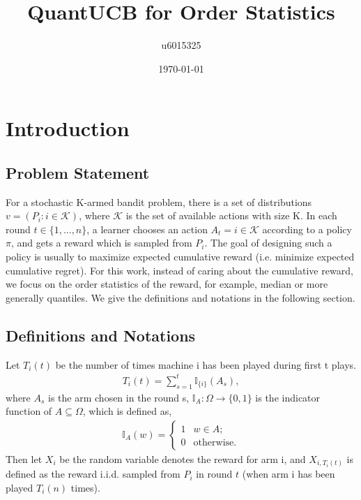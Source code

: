 \documentclass{article}
\title{QuantUCB for Order Statistics}
\author{u6015325 }
\date{\today}
\theoremstyle{plain}
\begin{document}
\maketitle

\section{Introduction}

\subsection{Problem Statement}

    For a stochastic K-armed bandit problem, there is a set of distributions $v = (P_i: i \in \mathcal{K})$, where $\mathcal{K}$ is the set of available actions with size K. In each round $t \in \{1, ..., n\}$, a learner chooses an action $A_t = i \in \mathcal{K}$ according to a policy $\pi$, and gets a reward which is sampled from $P_i$. The goal of designing such a policy is usually to maximize expected cumulative reward (i.e. minimize expected cumulative regret). For this work, instead of caring about the cumulative reward, we focus on the order statistics of the reward, for example, median or more generally quantiles. We give the definitions and notations in the following section. 
    
\subsection{Definitions and Notations}
    
    Let $T_i(t)$ be the number of times machine i has been played during first t plays. 
    \begin{align}
        T_i(t) = \sum_{s = 1}^t \mathbb{I}_{\{i\}} (A_s),
    \end{align}
    where $A_s$ is the arm chosen in the round s, $\mathbb{I}_A: \Omega\rightarrow \{0,1\}$ is the indicator function of $A \subseteq \Omega$, which is defined as, 
    \begin{align}
        \mathbb{I}_A(w) = \begin{cases}
                            1 & w \in A;\\
                            0 & \text{otherwise}.
                            \end{cases}
    \end{align}
    Then let $X_i$ be the random variable denotes the reward for arm i, and $X_{i,T_i(t)}$ is defined as the reward i.i.d. sampled from $P_i$ in round $t$ (when arm i has been played $T_i(n)$ times). \\
    
\end{document}
